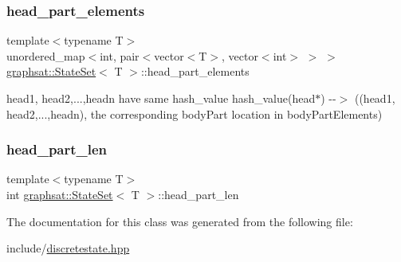 \mbox{\label{classgraphsat_1_1_state_set_aa82adee471b2bd7245d92c08d0d24991}} 
\subsubsection{\texorpdfstring{head\_part\_elements}{head\_part\_elements}}
{\footnotesize\ttfamily template$<$typename T$>$ \\
unordered\+\_\+map$<$int, pair$<$vector$<$T$>$, vector$<$int$>$ $>$ $>$ \mbox{\hyperlink{classgraphsat_1_1_state_set}{graphsat\+::\+State\+Set}}$<$ T $>$\+::head\+\_\+part\+\_\+elements\hspace{0.3cm}{\ttfamily [private]}}

head1, head2,...,headn have same hash\+\_\+value hash\+\_\+value(head$\ast$) -\/-\/$>$ ((head1, head2,...,headn), the corresponding body\+Part location in body\+Part\+Elements) \mbox{\label{classgraphsat_1_1_state_set_a7d6ffe4819cda042a16fd46cac949010}} 
\subsubsection{\texorpdfstring{head\_part\_len}{head\_part\_len}}
{\footnotesize\ttfamily template$<$typename T$>$ \\
int \mbox{\hyperlink{classgraphsat_1_1_state_set}{graphsat\+::\+State\+Set}}$<$ T $>$\+::head\+\_\+part\+\_\+len\hspace{0.3cm}{\ttfamily [private]}}



The documentation for this class was generated from the following file\+:\begin{DoxyCompactItemize}
\item 
include/\mbox{\hyperlink{discretestate_8hpp}{discretestate.\+hpp}}\end{DoxyCompactItemize}
